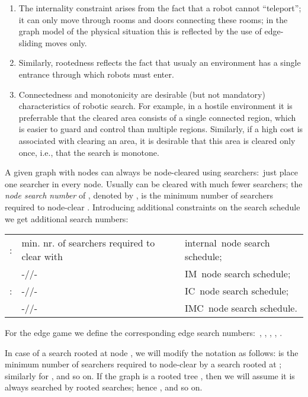 \documentclass[11pt]{article}\usepackage{amsmath}
\begin{document}
\begin{enumerate}
\item The internality constraint arises from the fact that a robot cannot
\textquotedblleft teleport\textquotedblright; it can only move through rooms
and doors connecting these rooms; in the graph model of the physical situation
this is reflected by the use of edge-sliding moves only.

\item Similarly, rootedness reflects the fact that usualy an environment has a
single entrance through which robots must enter.

\item Connectedness and monotonicity are desirable (but not mandatory)
characteristics of robotic search. For example, in a hostile environment it is
preferrable that the cleared area consists of a single connected region, which
is easier to guard and control than multiple regions. Similarly, if a high
cost is associated with clearing an area, it is desirable that this area is
cleared only once, i.e., that the search is monotone.
\end{enumerate}

A given graph  with  nodes can always be node-cleared using 
searchers:\ just place one searcher in every node. Usually  can be
cleared with much fewer searchers; the \emph{node search number} of
, denoted by , is the minimum
number of searchers required to node-clear . Introducing
additional constraints on the search schedule we get additional search numbers:

\begin{center}\begin{tabular}
[c]{lll} : & min. nr. of searchers required to
clear  with & internal\ node search schedule;\\
 & \qquad\qquad\qquad-//- & IM\ node
search schedule;\\
 : & \qquad\qquad\qquad-//- & IC\ node
search schedule;\\
 & \qquad\qquad\qquad-//- & IMC\ node
search schedule.
\end{tabular}



\end{center}

For the edge game we define the corresponding edge search numbers:\ , ,
, , .

In case of a search rooted at node , we will modify the notation as
follows:  is the minimum number of
searchers required to node-clear  by a search rooted at ;
similarly for ,  and so on. If the graph  is a rooted tree
, then we will assume it is always searched by rooted
searches; hence ,  and so on.
\end{document}
